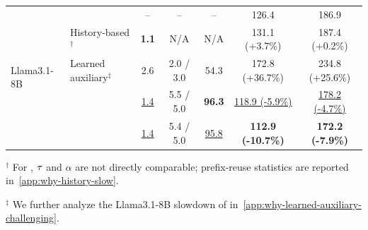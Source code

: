 \begin{table}[t]
\begin{tabular}{llccccc}
\midrule

\multirow{5}{*}{Llama3.1-8B}
& \nosd{}
& --
& --
& --
& 126.4
& 186.9 \\
& History-based$^\dagger$
& \textbf{1.1}
& N/A
& N/A
& 131.1 (+3.7\%)
& 187.4 (+0.2\%) \\
& Learned auxiliary$^\ddagger$
& 2.6
& 2.0 / 3.0
& 54.3
& 172.8 (+36.7\%)
& 234.8 (+25.6\%) \\
& \Alwayssd{}
& \underline{1.4}
& 5.5 / 5.0
& \textbf{96.3}
& \underline{118.9 (-5.9\%)}
& \underline{178.2 (-4.7\%)} \\
\rowcolor{gray!10}
\cellcolor{white}
& \methodtitle{}
& \underline{1.4}
& 5.4 / 5.0
& \underline{95.8}
& \textbf{112.9 (-10.7\%)}
& \textbf{172.2 (-7.9\%)} \\

\bottomrule
\end{tabular}

\vspace{2pt}
\begin{minipage}{0.98\linewidth}
\footnotesize
$^\dagger$ For \history{}, $\tau$ and $\alpha$ are not directly comparable; prefix-reuse statistics are reported in~\cref{app:why-history-slow}.

$^\ddagger$ We further analyze the Llama3.1-8B slowdown of \learned{} in~\cref{app:why-learned-auxiliary-challenging}.
\end{minipage}
\end{table}
